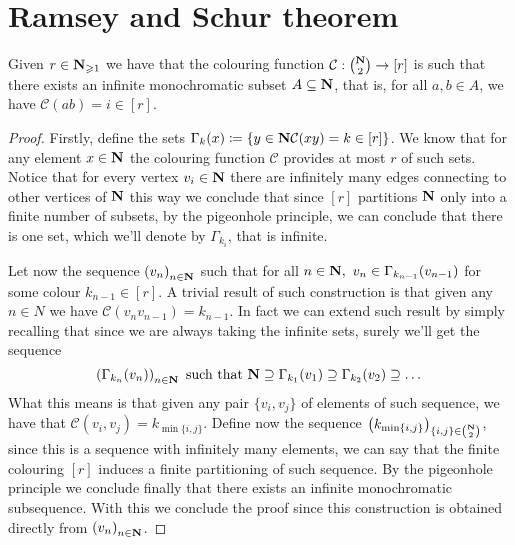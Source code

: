 \section{Ramsey and Schur theorem}

\begin{theorem}\label{ramseyThmGraphs}
    Given \(r \in \mathbf{N}_{\geqslant 1}\) we have that the colouring function
    \(\mathcal{C}: \binom{\mathbf{N}}{2} \to [r]\) is such that there exists an
    infinite monochromatic subset \(A \subseteq \mathbf{N}\), that is, for all \(a, b
    \in A\), we have \(\mathcal{C}(ab) = i \in [r]\).
\end{theorem}

\begin{proof}
    Firstly, define the sets \(\Gamma_k(x) \coloneq \{y \in \mathbf{N} \relax \mathcal{C}(x
    y) = k \in [r]\}\). We know that for any element \(x \in \mathbf{N}\) the
    colouring function \(\mathcal{C}\) provides at most \(r\) of such sets. Notice
    that for every vertex \(v_i \in \mathbf{N}\) there are infinitely many edges
    connecting to other vertices of \(\mathbf{N}\) this way we conclude that
    since \([r]\) partitions \(\mathbf{N}\) only into a finite number of subsets,
    by the pigeonhole principle, we can conclude that there is one set, which
    we'll denote by \(\Gamma_{k_i}\), that is infinite.

    Let now the sequence \(\left( v_n \right)_{n \in \mathbf{N}}\) such that for all
    \(n \in \N,\ v_n \in \Gamma_{k_{n-1}}(v_{n-1})\) for some
    colour \(k_{n-1} \in [r]\). A trivial result of such construction is that
    given any \(n \in N\) we have \(\mathcal{C}(v_n v_{n-1}) = k_{n-1}\). In fact
    we can extend such result by simply recalling that since we are always taking
    the infinite sets, surely we'll get the sequence
    \[
        \left( \Gamma_{k_{n}}(v_n) \right)_{n \in \mathbf{N}} \text{ such that }
        \mathbf{N} \supseteq \Gamma_{k_{1}}(v_1) \supseteq  \Gamma_{k_{2}}(v_2)
        \supseteq \dots
    \]
    What this means is that given any pair \(\{v_i, v_j\}\) of elements of such
    sequence, we have that \(\mathcal{C}(v_i, v_j) = k_{\min \{i, j\}}\). Define
    now the sequence \(\left( k_{\min \{i, j\}} \right)_{\{i, j\} \in
    \binom{\mathbf{N}}{2}}\), since this is a sequence with infinitely many
    elements, we can say that the finite colouring \([r]\) induces a finite
    partitioning of such sequence. By the pigeonhole principle we conclude
    finally that there exists an infinite monochromatic subsequence. With this we
    conclude the proof since this construction is obtained directly from \(\left(
    v_n \right)_{n \in \mathbf{N}}\).
\end{proof}

